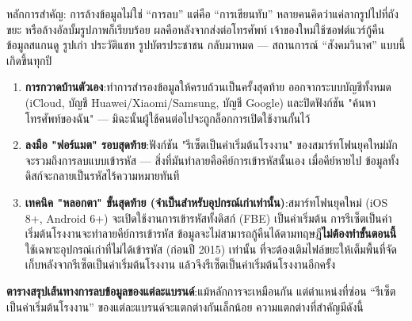 


หลักการสำคัญ: การล้างข้อมูลไม่ใช่ “การลบ” แต่คือ “การเขียนทับ” หลายคนคิดว่าแค่ลากรูปไปที่ถังขยะ หรือล้างอัลบั้มรูปภาพก็เรียบร้อย ผลคือหลังจากส่งต่อโทรศัพท์ เจ้าของใหม่ใช้ซอฟต์แวร์กู้คืนข้อมูลสแกนดู รูปเก่า ประวัติแชท รูปบัตรประชาชน กลับมาหมด — สถานการณ์ “สังคมวินาศ” แบบนี้เกิดขึ้นทุกปี

\begin{enumerate}
  \item \textbf{การกวาดบ้านตัวเอง}:ทำการสำรองข้อมูลให้ครบถ้วนเป็นครั้งสุดท้าย ออกจากระบบบัญชีทั้งหมด (iCloud, บัญชี Huawei/Xiaomi/Samsung, บัญชี Google) และปิดฟังก์ชัน "ค้นหาโทรศัพท์ของฉัน" — มิฉะนั้นผู้ใช้คนต่อไปจะถูกล็อกการเปิดใช้งานกั้นไว้
  \item \textbf{ลงมือ "ฟอร์แมต" รอบสุดท้าย}:ฟังก์ชัน "รีเซ็ตเป็นค่าเริ่มต้นโรงงาน" ของสมาร์ทโฟนยุคใหม่มักจะรวมถึงการลบแบบเข้ารหัส — สิ่งที่มันทำลายคือคีย์การเข้ารหัสนั้นเอง เมื่อคีย์หายไป ข้อมูลทั้งดิสก์จะกลายเป็นรหัสไร้ความหมายทันที
  \item \textbf{เทคนิค "หลอกตา" ขั้นสุดท้าย (จำเป็นสำหรับอุปกรณ์เก่าเท่านั้น)}:สมาร์ทโฟนยุคใหม่ (iOS 8+, Android 6+) จะเปิดใช้งานการเข้ารหัสทั้งดิสก์ (FBE) เป็นค่าเริ่มต้น การรีเซ็ตเป็นค่าเริ่มต้นโรงงานจะทำลายคีย์การเข้ารหัส ข้อมูลจะไม่สามารถกู้คืนได้ตามทฤษฎี\textbf{ไม่ต้องทำขั้นตอนนี้}ใช้เฉพาะอุปกรณ์เก่าที่ไม่ได้เข้ารหัส (ก่อนปี 2015) เท่านั้น ที่จะต้องเติมไฟล์ขยะให้เต็มพื้นที่จัดเก็บหลังจากรีเซ็ตเป็นค่าเริ่มต้นโรงงาน แล้วจึงรีเซ็ตเป็นค่าเริ่มต้นโรงงานอีกครั้ง
\end{enumerate}

\textbf{ตารางสรุปเส้นทางการลบข้อมูลของแต่ละแบรนด์}:แม้หลักการจะเหมือนกัน แต่ตำแหน่งที่ซ่อน “รีเซ็ตเป็นค่าเริ่มต้นโรงงาน” ของแต่ละแบรนด์จะแตกต่างกันเล็กน้อย ความแตกต่างที่สำคัญมีดังนี้

